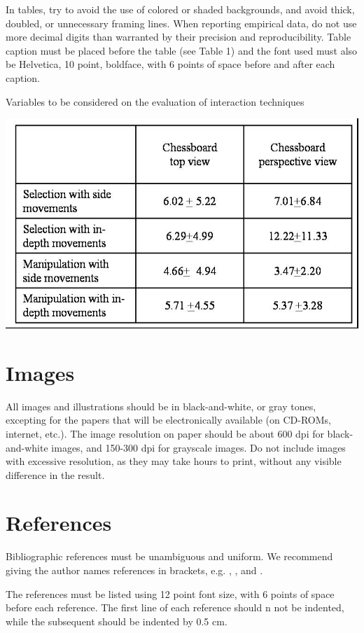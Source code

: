 \documentclass[12pt]{article}
\begin{document}
In tables, try to avoid the use of colored or shaded backgrounds, and avoid
thick, doubled, or unnecessary framing lines. When reporting empirical data,
do not use more decimal digits than warranted by their precision and
reproducibility. Table caption must be placed before the table (see Table 1)
and the font used must also be Helvetica, 10 point, boldface, with 6 points of
space before and after each caption.

\begin{table}[ht]
\centering
\caption{Variables to be considered on the evaluation of interaction
  techniques}
\label{tab:exTable8}
\includegraphics[width=.7\textwidth]{table.jpg}
\end{table}

\section{Images}

All images \cite{Angles:2010} and illustrations should be in black-and-white, or gray tones,
excepting for the papers that will be electronically available (on CD-ROMs,
internet, etc.). The image resolution on paper should be about 600 dpi for
black-and-white images, and 150-300 dpi for grayscale images.  Do not include
images with excessive resolution, as they may take hours to print, without any
visible difference in the result. 

\section{References}

Bibliographic references must be unambiguous and uniform.  We recommend giving
the author names references in brackets, e.g. \cite{Corbelini:2017},
\cite{Leavitt:2010}, and \cite{Stonebreaker:2010}.

The references must be listed using 12 point font size, with 6 points of space
before each reference. The first line of each reference should n not be
indented, while the subsequent should be indented by 0.5 cm.



\end{document}
